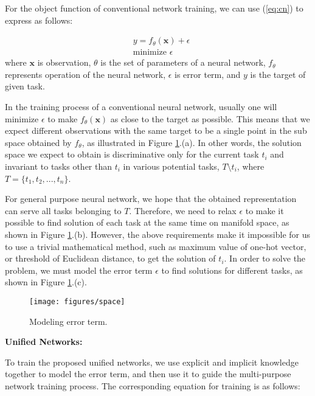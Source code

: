 \documentclass[10pt,twocolumn,letterpaper]{article}
\begin{document}
For the object function of conventional network training, we can use (\ref{eq:cn}) to express as follows:

\begin{equation}
\begin{split}
& y = f_{\theta}(\mathbf{x}) + \epsilon \\
& \text{minimize } \epsilon
\end{split}
\label{eq:cn}
\end{equation}
where $\mathbf{x}$ is observation, $\theta$ is the set of parameters of a neural network, $f_{\theta}$ represents operation of the neural network, $\epsilon$ is error term, and $y$ is the target of given task.

In the training process of a conventional neural network, usually one will minimize $\epsilon$ to make $f_{\theta}(\mathbf{x})$ as close to the target as possible. This means that we expect different observations with the same target to be a single point in the sub space obtained by $f_{\theta}$, as illustrated in Figure \ref{fig:spa}.(a). In other words, the solution space we expect to obtain is discriminative only for the current task $t_{i}$ and invariant to tasks other than $t_{i}$ in various potential tasks, $T \setminus t_{i}$, where $T = \{t_{1}, t_{2}, ..., t_{n}\}$.

For general purpose neural network, we hope that the obtained representation can serve all tasks belonging to $T$. Therefore, we need to relax $\epsilon$ to make it possible to find solution of each task at the same time on manifold space, as shown in Figure \ref{fig:spa}.(b). However, the above requirements make it impossible for us to use a trivial mathematical method, such as maximum value of one-hot vector, or threshold of Euclidean distance, to get the solution of $t_{i}$. In order to solve the problem, we must model the error term $\epsilon$ to find solutions for different tasks, as shown in Figure \ref{fig:spa}.(c).

\begin{figure}[h]
	\vspace{-2mm}
	\begin{center}
		\texttt{[image: figures/space]}
	\end{center}
	\caption{Modeling error term.}
	\vspace{-4mm}
	\label{fig:spa}
\end{figure}

\noindent
\textbf{Unified Networks:}

To train the proposed unified networks, we use explicit and implicit knowledge together to model the error term, and then use it to guide the multi-purpose network training process. The corresponding equation for training is as follows:
\end{document}
